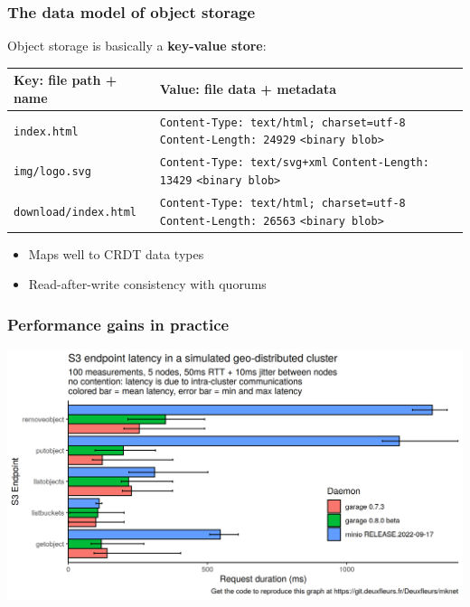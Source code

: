 \documentclass[aspectratio=169,xcolor={svgnames}]{beamer}
\begin{document}
\begin{frame}
	\frametitle{The data model of object storage}
	Object storage is basically a \textbf{key-value store}:
	\vspace{.5em}

	{\scriptsize
		\begin{center}
		\begin{tabular}{|l|p{7cm}|}
			\hline
			\textbf{Key: file path + name} & \textbf{Value: file data + metadata} \\
			\hline
			\hline
			\texttt{index.html} &
				\texttt{Content-Type: text/html; charset=utf-8} \newline
				\texttt{Content-Length: 24929} \newline
				\texttt{<binary blob>} \\ 
			\hline
			\texttt{img/logo.svg} &
				\texttt{Content-Type: text/svg+xml} \newline
				\texttt{Content-Length: 13429} \newline
				\texttt{<binary blob>} \\ 
			\hline
			\texttt{download/index.html} &
				\texttt{Content-Type: text/html; charset=utf-8} \newline
				\texttt{Content-Length: 26563} \newline
				\texttt{<binary blob>} \\ 
			\hline
		\end{tabular}
		\end{center}
		}

	\vspace{.5em}
	\begin{itemize}
		\item<2-> Maps well to CRDT data types
		\item<3> Read-after-write consistency with quorums
	\end{itemize}
\end{frame}


\begin{frame}
	\frametitle{Performance gains in practice}
	\begin{center}
		\includegraphics[width=.8\linewidth]{../assets/perf/endpoint_latency_0.7_0.8_minio.png}
	\end{center}
\end{frame}
\end{document}
